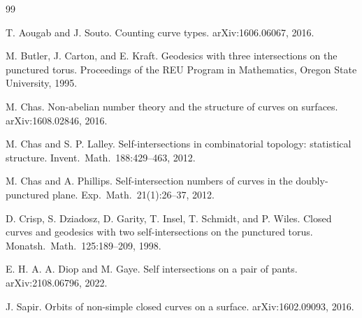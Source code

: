 \documentclass[10pt]{article}
\begin{document}
\begin{thebibliography}{99}

T. Aougab and J. Souto.
\newblock Counting curve types.
\newblock arXiv:1606.06067, 2016.

M. Butler, J. Carton, and E. Kraft.
\newblock Geodesics with three intersections on the punctured torus.
\newblock Proceedings of the REU Program in Mathematics, Oregon State University, 1995.

M. Chas.
\newblock Non-abelian number theory and the structure of curves on surfaces.
\newblock arXiv:1608.02846, 2016.

M. Chas and S. P. Lalley.
\newblock Self-intersections in combinatorial topology: statistical structure.
\newblock Invent.\ Math.\ 188:429--463, 2012.

M. Chas and A. Phillips.
\newblock Self-intersection numbers of curves in the doubly-punctured plane.
\newblock Exp.\ Math.\ 21(1):26--37, 2012.

D. Crisp, S. Dziadosz, D. Garity, T. Insel, T. Schmidt, and P. Wiles.
\newblock Closed curves and geodesics with two self-intersections on the punctured torus.
\newblock Monatsh.\ Math.\ 125:189--209, 1998.

E. H. A. A. Diop and M. Gaye.
\newblock Self intersections on a pair of pants.
\newblock arXiv:2108.06796, 2022.

J. Sapir.
\newblock Orbits of non-simple closed curves on a surface.
\newblock arXiv:1602.09093, 2016.

\end{thebibliography}
\end{document}
